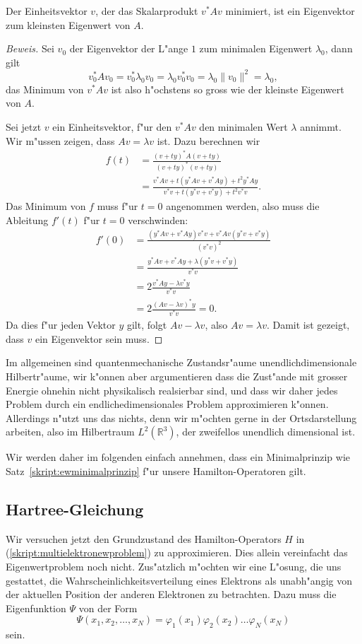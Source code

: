 \begin{satz}
Der Einheitsvektor $v$, der das Skalarprodukt $v^*Av$ minimiert,
ist ein Eigenvektor zum kleinsten Eigenwert von $A$.
\label{skript:ewminimalprinzip}
\end{satz}

\begin{proof}[Beweis]
Sei $v_0$ der Eigenvektor der L"ange $1$ zum minimalen Eigenwert $\lambda_0$,
dann gilt
\[
v_0^*Av_0=v_0^*\lambda_0 v_0=\lambda_0 v_0^*v_0=\lambda_0 \|v_0\|^2=\lambda_0,
\]
das Minimum von $v^*Av$ ist also h"ochstens so gross wie der kleinste
Eigenwert von $A$.

Sei jetzt $v$ ein Einheitsvektor, f"ur den $v^*Av$ den minimalen Wert 
$\lambda$ annimmt.
Wir m"ussen zeigen, dass $Av=\lambda v$ ist. 
Dazu berechnen wir
\begin{align*}
f(t)
&=
\frac{(v+ty)^*A(v+ty)}{(v+ty)^*(v+ty)}
\\
&=
\frac{v^*Av+t(y^*Av+v^*Ay)+t^2y^*Ay}{v^*v+t(y^*v+v^*y)+t^2v^*v}.
\end{align*}
Das Minimum von $f$ muss f"ur $t=0$ angenommen werden, also muss
die Ableitung $f'(t)$ f"ur $t=0$ verschwinden:
\begin{align*}
f'(0)
&=
\frac{(y^*Av+v^*Ay)v^*v + v^*Av(y^*v+v^*y)}{(v^*v)^2}
\\
&=
\frac{y^*Av+v^*Ay + \lambda(y^*v+v^*y)}{v^*v}
\\
&=
2\frac{v^*Ay-\lambda v^*y}{v^*v}
\\
&=
2\frac{(Av-\lambda v)^*y}{v^*v}=0.
\end{align*}
Da dies f"ur jeden Vektor $y$ gilt, folgt $Av-\lambda v$, also $Av=\lambda v$.
Damit ist gezeigt, dass $v$ ein Eigenvektor sein muss.
\end{proof}

Im allgemeinen sind quantenmechanische Zustandsr"aume unendlichdimensionale
Hilbertr"aume, wir k"onnen aber argumentieren dass die Zust"ande mit grosser
Energie ohnehin nicht physikalisch realsierbar sind, und dass wir daher
jedes Problem durch ein endlichedimensionales Problem approximieren k"onnen.
Allerdings n"utzt uns das nichts, denn wir m"ochten gerne in der
Ortsdarstellung arbeiten, also im Hilbertraum $L^2({\mathbb R}^3)$,
der zweifellos unendlich dimensional ist.

Wir werden daher im folgenden einfach annehmen, dass ein Minimalprinzip
wie Satz~\ref{skript:ewminimalprinzip} f"ur unsere Hamilton-Operatoren gilt.

\subsection{Hartree-Gleichung}
Wir versuchen jetzt den Grundzustand des Hamilton-Operators $H$ in
(\ref{skript:multielektronewproblem}) zu approximieren.
Dies allein vereinfacht das Eigenwertproblem noch nicht. 
Zus"atzlich m"ochten wir eine L"osung, die uns gestattet,
die Wahrscheinlichkeitsverteilung eines Elektrons als unabh"angig von 
der aktuellen Position der anderen Elektronen zu betrachten.
Dazu muss die Eigenfunktion $\Psi$ von der Form
\[
\Psi(x_1,x_2,\dots,x_N)=\varphi_1(x_1)\varphi_2(x_2)\dots\varphi_N(x_N)
\]
sein.

